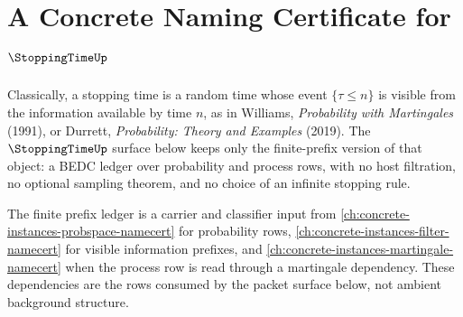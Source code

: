 \chapter{A Concrete Naming Certificate for $\StoppingTimeUp$}
\label{ch:concrete-instances-stoppingtime-namecert}

Classically, a stopping time is a random time whose event $\{\tau\leq n\}$ is
visible from the information available by time $n$, as in Williams,
\emph{Probability with Martingales} (1991), or Durrett, \emph{Probability:
Theory and Examples} (2019). The $\StoppingTimeUp$ surface below keeps only
the finite-prefix version of that object: a BEDC ledger over probability and
process rows, with no host filtration, no optional sampling theorem, and no
choice of an infinite stopping rule.

The finite prefix ledger is a carrier and classifier input from
\autoref{ch:concrete-instances-probspace-namecert} for probability rows,
\autoref{ch:concrete-instances-filter-namecert} for visible information
prefixes, and \autoref{ch:concrete-instances-martingale-namecert} when the
process row is read through a martingale dependency. These dependencies are
the rows consumed by the packet surface below, not ambient background
structure.

